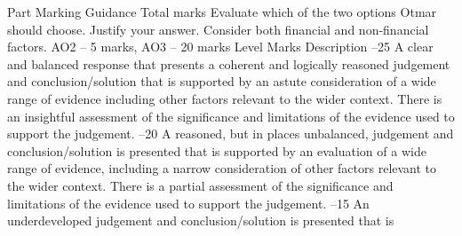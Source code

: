 \documentclass{article}
\begin{document}
Part \newline
Marking Guidance \newline
Total \newline
marks  \newline
 \newline
Evaluate which of the two options Otmar should choose.  Justify your answer. \newline
 \newline
Consider both financial and non-financial factors.  \newline
 \newline
AO2 – 5 marks, AO3 – 20 marks \newline
 \newline
Level  \newline
 Marks  Description  –25 \newline
A clear and balanced response that presents a coherent and logically reasoned \newline
judgement and conclusion/solution that is supported by an astute consideration of a \newline
wide range of evidence including other factors relevant to the wider context.  \newline
 \newline
There is an insightful assessment of the significance and limitations of the evidence \newline
used to support the judgement.  –20 \newline
A reasoned, but in places unbalanced, judgement and conclusion/solution is \newline
presented that is supported by an evaluation of a wide range of evidence, including a \newline
narrow consideration of other factors relevant to the wider context.  \newline
 \newline
There is a partial assessment of the significance and limitations of the evidence used \newline
to support the judgement.  –15 \newline
An underdeveloped judgement and conclusion/solution is presented that is \newline
\end{document}
